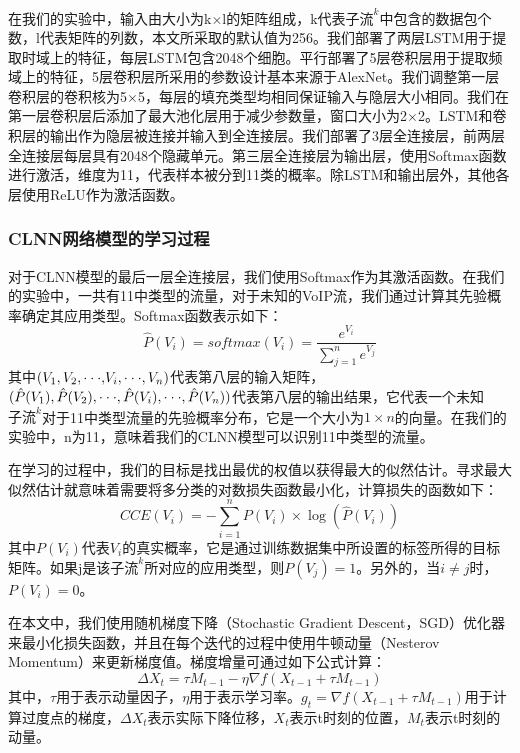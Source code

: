 在我们的实验中，输入由大小为k$\times$l的矩阵组成，k代表$\text{子流}^k$中包含的数据包个数，l代表矩阵的列数，本文所采取的默认值为256。我们部署了两层LSTM用于提取时域上的特征，每层LSTM包含2048个细胞。平行部署了5层卷积层用于提取频域上的特征，5层卷积层所采用的参数设计基本来源于AlexNet。我们调整第一层卷积层的卷积核为5$\times$5，每层的填充类型均相同保证输入与隐层大小相同。我们在第一层卷积层后添加了最大池化层用于减少参数量，窗口大小为2$\times$2。LSTM和卷积层的输出作为隐层被连接并输入到全连接层。我们部署了3层全连接层，前两层全连接层每层具有2048个隐藏单元。第三层全连接层为输出层，使用Softmax函数进行激活，维度为11，代表样本被分到11类的概率。除LSTM和输出层外，其他各层使用ReLU作为激活函数。


\subsubsection{CLNN网络模型的学习过程}
对于CLNN模型的最后一层全连接层，我们使用Softmax作为其激活函数。在我们的实验中，一共有11中类型的流量，对于未知的VoIP流，我们通过计算其先验概率确定其应用类型。Softmax函数表示如下：
\begin{equation}
\hat P({V_i}) = softmax({V_i}) = \frac{{{e^{{V_i}}}}}{{\sum\limits_{j = 1}^n {{e^{{V_j}}}} }}
\end{equation}
其中$({V_1},{V_2},{\rm{\cdot\cdot\cdot,}}{V_i},{\rm{\cdot\cdot\cdot}},{V_n})$代表第八层的输入矩阵，$(\hat P({V_1}),\hat P({V_2}),{\rm{\cdot\cdot\cdot}},\hat P({V_i}),{\rm{\cdot\cdot\cdot}},\hat P({V_n}))$代表第八层的输出结果，它代表一个未知$\text{子流}^k$对于11中类型流量的先验概率分布，它是一个大小为$1 \times n$的向量。在我们的实验中，n为11，意味着我们的CLNN模型可以识别11中类型的流量。

在学习的过程中，我们的目标是找出最优的权值以获得最大的似然估计。寻求最大似然估计就意味着需要将多分类的对数损失函数最小化，计算损失的函数如下：
\begin{equation}
CCE({V_i}) =  - \sum\limits_{i = 1}^n {P({V_i}) \times \log (\hat P({V_i}))}
\end{equation}
其中$P({V_i})$代表${V_i}$的真实概率，它是通过训练数据集中所设置的标签所得的目标矩阵。如果j是该$\text{子流}^k$所对应的应用类型，则$P({V_j})=1$。另外的，当$i \ne j$时，$P({V_i})=0$。

在本文中，我们使用随机梯度下降（Stochastic Gradient Descent，SGD）优化器来最小化损失函数，并且在每个迭代的过程中使用牛顿动量（Nesterov Momentum）来更新梯度值。梯度增量可通过如下公式计算：
\begin{equation}
\Delta {X_t} = \tau {M_{t - 1}} - \eta \nabla f({X_{t - 1}} + \tau {M_{t - 1}})
\end{equation}
其中，${\tau}$用于表示动量因子，${\eta}$用于表示学习率。${g_t} = \nabla f({X_{t - 1}} + \tau {M_{t - 1}})$用于计算过度点的梯度，$\Delta {X_t}$表示实际下降位移，${X_t}$表示t时刻的位置，${M_t}$表示t时刻的动量。

